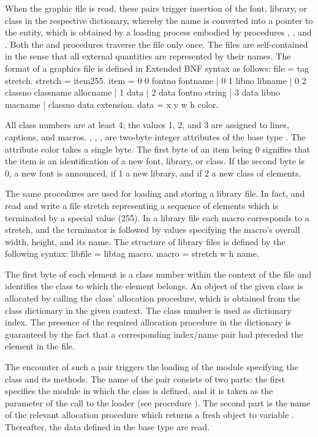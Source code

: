 When the graphic file is read, these pairs trigger insertion of the font, library, or class in the respective dictionary, whereby the name is converted into a pointer to the entity, which is obtained by a loading process embodied by procedures , , and . Both the  and  procedures traverse the file only once. The files are self-contained in the sense that all external quantities are represented by their names. The format of a graphics file is defined in Extended BNF syntax as follows:
\begintt
file    = tag stretch.
stretch = {item}255.
item    = 0 0 fontno fontname | 0 1 libno libname |
          0 2 classno classname allocname |
          1 data | 2 data fontno string |
          3 data libno macname | classno data extension.
data    =  x y w h color.
\endtt

All class numbers are at least 4; the values 1, 2, and 3 are assigned to lines, captions, and macros. , , ,  are two-byte integer attributes of the base type . The attribute color takes a single byte. The first byte of an item being 0 signifies that the item is an identification of a new font, library, or class. If the second byte is 0, a new font is announced, if 1 a new library, and if 2 a new class of elements.

The same procedures are used for loading and storing a library file. In fact,  and  read and write a file stretch representing a sequence of elements which is terminated by a special value (255). In a library file each macro corresponds to a stretch, and the terminator is followed by values specifying the macro's overall width, height, and its name. The structure of library files is defined by the following syntax:
\begintt
libfile = libtag {macro}.
macro = stretch w h name.
\endtt

The first byte of each element is a class number within the context of the file and identifies the class to which the element belongs. An object of the given class is allocated by calling the class' allocation procedure, which is obtained from the class dictionary in the given context. The class number is used as dictionary index. The presence of the required allocation procedure in the dictionary is guaranteed by the fact that a corresponding index/name pair had preceded the element in the file.

The encounter of such a pair triggers the loading of the module specifying the class and its methods. The name of the pair consists of two parts: the first specifies the module in which the class is defined, and it is taken as the parameter of the call to the loader (see procedure ). The second part is the name of the relevant allocation procedure which returns a fresh object to variable . Thereafter, the data defined in the base type  are read.

